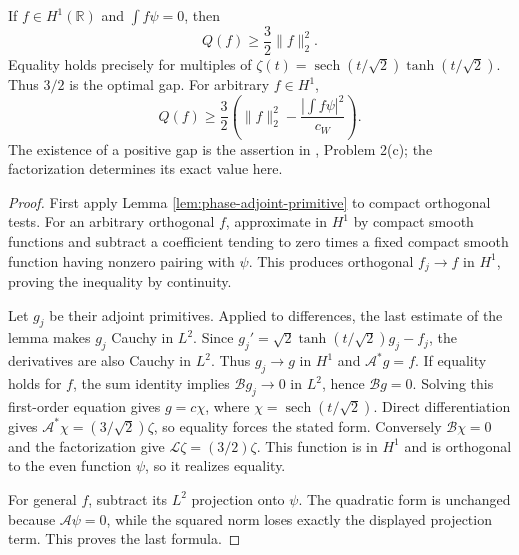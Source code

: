 \begin{theorem}\label{thm:phase-sharp-normal-gap}
If $f\in H^1(\mathbb R)$ and $\int f\psi=0$, then
\[
 Q(f)\geq\frac32\|f\|_2^2.
\]
Equality holds precisely for multiples of
$\zeta(t)=\operatorname{sech}(t/\sqrt2)\tanh(t/\sqrt2)$.
Thus $3/2$ is the optimal gap. For arbitrary $f\in H^1$,
\[
 Q(f)\geq\frac32\left(\|f\|_2^2-
 \frac{|\int f\psi|^2}{c_W}\right).
\]
The existence of a positive gap is the assertion in \cite{ChAC}, Problem 2(c); the factorization determines its exact value here.
\end{theorem}
\begin{proof}
First apply Lemma \ref{lem:phase-adjoint-primitive} to compact orthogonal tests. For an arbitrary orthogonal $f$, approximate in $H^1$ by compact smooth functions and subtract a coefficient tending to zero times a fixed compact smooth function having nonzero pairing with $\psi$. This produces orthogonal $f_j\to f$ in $H^1$, proving the inequality by continuity.

Let $g_j$ be their adjoint primitives. Applied to differences, the last estimate of the lemma makes $g_j$ Cauchy in $L^2$. Since $g_j'=\sqrt2\tanh(t/\sqrt2)g_j-f_j$, the derivatives are also Cauchy in $L^2$. Thus $g_j\to g$ in $H^1$ and $\mathcal A^*g=f$. If equality holds for $f$, the sum identity implies $\mathcal B g_j\to0$ in $L^2$, hence $\mathcal B g=0$. Solving this first-order equation gives $g=c\chi$, where $\chi=\operatorname{sech}(t/\sqrt2)$. Direct differentiation gives $\mathcal A^*\chi=(3/\sqrt2)\zeta$, so equality forces the stated form. Conversely $\mathcal B\chi=0$ and the factorization give $\mathscr L\zeta=(3/2)\zeta$. This function is in $H^1$ and is orthogonal to the even function $\psi$, so it realizes equality.

For general $f$, subtract its $L^2$ projection onto $\psi$. The quadratic form is unchanged because $\mathcal A\psi=0$, while the squared norm loses exactly the displayed projection term. This proves the last formula.
\end{proof}

